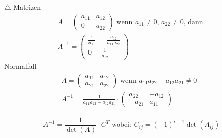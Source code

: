 \documentclass[a4paper,twocolumn]{article}
\begin{document}
	\begin{falgo}
			$\bigtriangleup$-Matrizen
			\begin{align*}
				A= \left(
					\begin{array}{cc}
						a_{11} & a_{12} \\
						0	   & a_{22}
					\end{array}
					\right) \text{ wenn $a_{11} \neq 0$, $a_{22} \neq 0$, dann } \\
				A^{-1}= \left(
					\begin{array}{cc}
						\frac{1}{a_{11}} & - \frac{a_{12}}{a_{11}a_{22}} \\
						0				 &   \frac{1}{a_{12}}
					\end{array} \right) 
			\end{align*} 
			Normalfall
			\begin{align*}
				A = \left( 
					\begin{array}{cc}
						a_{11} & a_{12} \\
						a_{21} & a_{22}
					\end{array} \right)
						\text{ wenn $a_{11}a_{22} - a_{12}a_{21} \neq 0$ } \\
				A^{-1} = \frac{1}{a_{11}a_{22} - a_{12}a_{21}} \cdot 
					\left( 
						\begin{array}{cc}
							a_{22} & -a_{12} \\
							-a_{21} & a_{11}
						\end{array} 
					\right)
			\end{align*}
		\end{falgo}
		
		\begin{falgo}
			
			\begin{align*}
				A^{-1} = \dfrac{1}{\det(A)} \cdot C^T \text{ wobei: }  C_{ij} = (-1)^{i+1} \det(A_{ij})
			\end{align*}

		\end{falgo}



			
\end{document}
